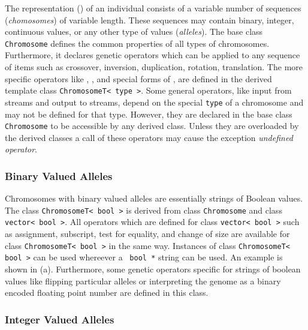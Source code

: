 The representation (\emph{}) of an individual consists of a
variable number of sequences (\emph{chomosomes}) of variable length.
These sequences may contain binary, integer, continuous values, or any
other type of values (\emph{alleles}). The base class
\verb+Chromosome+ defines the common properties of all types of
chromosomes.  Furthermore, it declares genetic operators which can be
applied to any sequence of items such as crossover, inversion,
duplication, rotation, translation.  The more specific operators like
, , and special forms of
, are defined in the derived template class
\texttt{ChromosomeT< type >}. Some general operators, like input from
streams and output to streams, depend on the special \texttt{type} of
a chromosome and may not be defined for that type.  However, they are
declared in the base class \verb+Chromosome+ to be accessible by any
derived class.  Unless they are overloaded by the derived classes a
call of these operators may cause the exception \emph{undefined
operator}.


        \subsubsection{Binary Valued Alleles}

Chromosomes with binary valued alleles are essentially strings of
Boolean values. The class \texttt{ChromosomeT< bool >} is
derived from class \verb+Chromosome+ and class \verb+vector< bool >+.
All operators which are defined for class \verb+vector< bool >+ such
as assignment, subscript, test for equality, and change of size are
available for class \verb+ChromosomeT< bool >+ in the same way.
Instances of class \verb+ChromosomeT< bool >+ can be used whereever a
\cpp\ \verb+bool *+ string can be used. An example is shown in
 (a). Furthermore, some genetic
operators specific for strings of boolean values like flipping
particular alleles or interpreting the genome as a binary encoded
floating point number are defined in this class.


        \subsubsection{Integer Valued Alleles}

